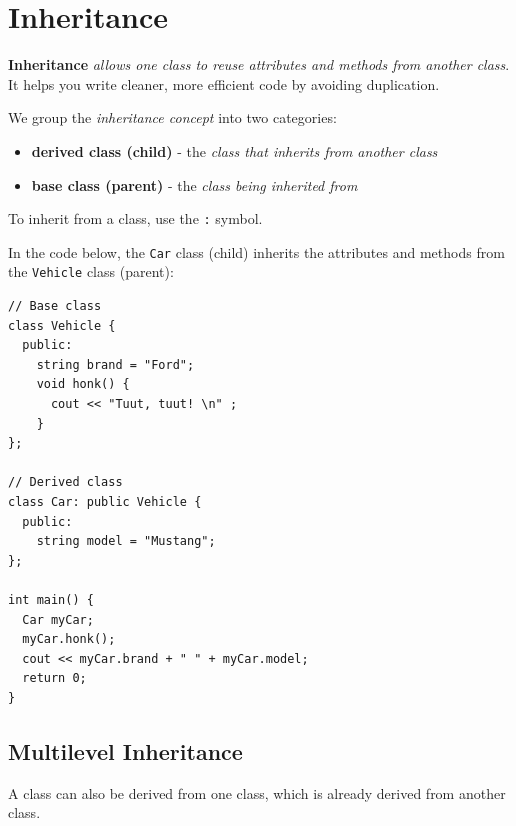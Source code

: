 \documentclass[../basic_programs.tex]{subfiles}
\begin{document}
  \section{Inheritance}

  \begin{mydef}
    \textbf{Inheritance} \textit{allows one class to reuse attributes and methods from another class}. It helps you write cleaner, more efficient code by avoiding duplication.
  \end{mydef}

  We group the \textit{inheritance concept} into two categories:

  \begin{itemize}
    \item \textbf{derived class (child)} - the \textit{class that inherits from another class}
    \item \textbf{base class (parent)} - the \textit{class being inherited from}
  \end{itemize}
  To inherit from a class, use the \lstinline|:| symbol.

  \begin{exa}
    In the code below, the \lstinline|Car| class (child) inherits the attributes and methods from the \lstinline|Vehicle| class (parent):

    \begin{lstlisting}[caption={caption},label=DescriptiveLabel]
// Base class
class Vehicle {
  public:
    string brand = "Ford";
    void honk() {
      cout << "Tuut, tuut! \n" ;
    }
};

// Derived class
class Car: public Vehicle {
  public:
    string model = "Mustang";
};

int main() {
  Car myCar;
  myCar.honk();
  cout << myCar.brand + " " + myCar.model;
  return 0;
}
    \end{lstlisting}
  \end{exa}

  \subsection{Multilevel Inheritance}

  A class can also be derived from one class, which is already derived from another class.
\end{document}

